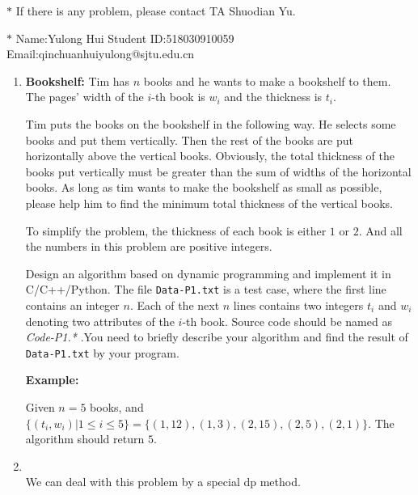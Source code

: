 \documentclass[12pt,a4paper]{article}
\makeatletter
\newtheorem*{solution}{Solution}
\theoremstyle{definition}
\renewenvironment{solution}[1][Solution] {\par\pushQED{\qed}\normalfont\topsep6\p@\@plus6\p@\relax\trivlist\item[\hskip\labelsep\bfseries#1\@addpunct{.}]\ignorespaces}{\popQED\endtrivlist\@endpefalse} \makeatother
\makeatother
\begin{document}
\noindent

\noindent{}
\begin{center}
\footnotesize{\color{red}$*$ If there is any problem, please contact TA Shuodian Yu.}

\footnotesize{\color{blue}$*$ Name:Yulong Hui  \quad Student ID:518030910059 \quad Email:qinchuanhuiyulong@sjtu.edu.cn }

\end{center}

\begin{enumerate}
    \item
    \textbf{Bookshelf: }Tim has $n$ books and he wants to make a bookshelf to them. The pages' width of the $i$-th book is $w_i$ and the thickness is $t_i$. 

    Tim puts the books on the bookshelf in the following way. He selects some books and put them vertically. Then the rest of the books are put horizontally above the vertical books. Obviously, the total thickness of the books put vertically must be greater than the sum of widths of the horizontal books. As long as tim wants to make the bookshelf as small as possible, please help him to find the minimum total thickness of the vertical books.

    To simplify the problem, the thickness of each book is either $1$ or $2$. And all the numbers in this problem are positive integers.

    Design an algorithm based on dynamic programming and implement it in C/C++/Python. The file \texttt{Data-P1.txt} is a test case, where the first line contains an integer $n$. Each of the next $n$ lines contains two integers $t_i$ and $w_i$ denoting two attributes of the $i$-th book. Source code should be named as
    {\color{red}\emph{Code-P1.*}} .You need to briefly describe your algorithm and find the result of \texttt{Data-P1.txt} by your program.

    \textbf{Example:}

    Given $n=5$ books, and $\{(t_i,w_i)|1\leq i \leq 5\} = \{(1,12),(1,3),(2,15),(2,5),(2,1)\}$. The algorithm should return $5$.

   \begin{solution}
   	~\\
	We can deal with this problem by a special dp method.
	

\end{solution}
\end{enumerate}
\end{document}
